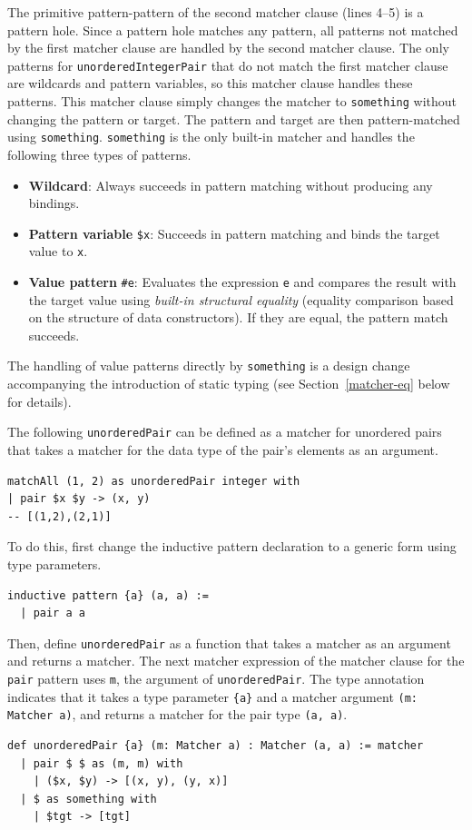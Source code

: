 The primitive pattern-pattern of the second matcher clause (lines 4--5) is a pattern hole.
Since a pattern hole matches any pattern, all patterns not matched by the first matcher clause are handled by the second matcher clause.
The only patterns for \lstinline{unorderedIntegerPair} that do not match the first matcher clause are wildcards and pattern variables, so this matcher clause handles these patterns.
This matcher clause simply changes the matcher to \lstinline{something} without changing the pattern or target.
The pattern and target are then pattern-matched using \lstinline{something}.
\lstinline{something} is the only built-in matcher and handles the following three types of patterns.
\begin{itemize}
  \item \textbf{Wildcard}: Always succeeds in pattern matching without producing any bindings.
  \item \textbf{Pattern variable} \lstinline{$x}: Succeeds in pattern matching and binds the target value to \lstinline{x}.
  \item \textbf{Value pattern} \lstinline{#e}: Evaluates the expression \lstinline{e} and compares the result with the target value using \emph{built-in structural equality} (equality comparison based on the structure of data constructors). If they are equal, the pattern match succeeds.
\end{itemize}
The handling of value patterns directly by \lstinline{something} is a design change accompanying the introduction of static typing (see Section~\ref{matcher-eq} below for details).

The following \lstinline{unorderedPair} can be defined as a matcher for unordered pairs that takes a matcher for the data type of the pair's elements as an argument.
\begin{lstlisting}[language=egison,numbers=none]
matchAll (1, 2) as unorderedPair integer with
| pair $x $y -> (x, y)
-- [(1,2),(2,1)]
\end{lstlisting}
To do this, first change the inductive pattern declaration to a generic form using type parameters.
\begin{lstlisting}[language=egison,numbers=none]
inductive pattern {a} (a, a) :=
  | pair a a
\end{lstlisting}
Then, define \lstinline{unorderedPair} as a function that takes a matcher as an argument and returns a matcher.
The next matcher expression of the matcher clause for the \lstinline{pair} pattern uses \lstinline{m}, the argument of \lstinline{unorderedPair}.
The type annotation indicates that it takes a type parameter \lstinline|{a}| and a matcher argument \lstinline|(m: Matcher a)|, and returns a matcher for the pair type \lstinline|(a, a)|.
\begin{lstlisting}[language=egison,numbers=none]
def unorderedPair {a} (m: Matcher a) : Matcher (a, a) := matcher
  | pair $ $ as (m, m) with
    | ($x, $y) -> [(x, y), (y, x)]
  | $ as something with
    | $tgt -> [tgt]
\end{lstlisting}

